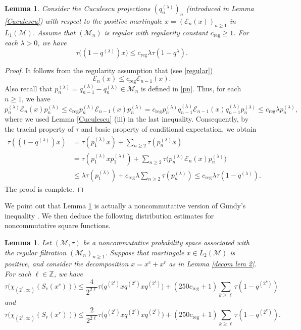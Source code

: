 \documentclass[11]{amsart}
\numberwithin{equation}{section}
\newtheorem{lemma}[theorem]{Lemma}
\newcommand{\M}{\mathcal{M}}
\begin{document}
\begin{lemma}\label{lem CGPr}
	Consider the Cuculescu projections $(q_n^{(\lambda)})_n$ (introduced in Lemma \ref{Cuculescu}) with respect to the positive martingale $x=(\mathcal{E}_n(x))_{n\geq1}$ in $L_1(\M)$. Assume that $(\mathcal{M}_n)$ is regular with regularity constant $c_{\mathrm{reg}}\geq 1$. For each $\lambda>0$, we have
	$$\tau\Big((1-q^{(\lambda)})x\Big)\leq c_{\mathrm{reg}}\lambda\tau(1-q^{\lambda}).$$
\end{lemma}
\begin{proof}
	It follows from the regularity assumption that (see \eqref{regular})
	$$\mathcal{E}_n(x)\leq c_{\mathrm{reg}}\mathcal{E}_{n-1}(x).$$
	Also recall that $p_n^{(\lambda)}=q_{n-1}^{(\lambda)}-q_n^{(\lambda)}\in \mathcal{M}_n$ is defined in \eqref{pn}.	Thus, for each $n\geq1$, we have
	$$p_n^{(\lambda)}\mathcal{E}_n(x)p_n^{(\lambda)}\leq c_{\mathrm{reg}}p_n^{(\lambda)}\mathcal{E}_{n-1}(x)p_n^{(\lambda)}=c_{\mathrm{reg}}p_n^{(\lambda)}q_{n-1}^{(\lambda)}\mathcal{E}_{n-1}(x)q_{n-1}^{(\lambda)}p_n^{(\lambda)}\leq  c_{\mathrm{reg}} \lambda p_n^{(\lambda)},$$
	where we used Lemma \ref{Cuculescu} (iii) in the last inequality.
	Consequently, by the tracial property of $\tau$ and basic property of conditional expectation, we obtain
	\begin{align*}
		\tau((1-q^{(\lambda)})x)&=\tau(p_1^{(\lambda)}x)+\sum_{n\geq2} \tau(p_n^{(\lambda)}x)\\
		&=\tau(p_1^{(\lambda)}xp_1^{(\lambda)})+\sum_{n\geq2} \tau\Big(p_n^{(\lambda)}\mathcal{E}_n(x)p_n^{(\lambda)}\Big)\\
		&\leq \lambda\tau(p_1^{(\lambda)})+c_{\mathrm{reg}}\lambda \sum_{n\geq2}\tau (p_n^{(\lambda)})\leq c_{\mathrm{reg}}\lambda \tau(1-q^{(\lambda)}).
	\end{align*}
	The proof is complete. 
\end{proof}




We point out that Lemma \ref{lem CGPr} is actually a noncommutative version of Gundy's inequality \cite[Theorem 2]{Gu1969}. 
We then deduce the following distribution estimates for noncommutative square functions. 



\begin{lemma}\label{distribution S}
	Let $(\mathcal{M},\tau)$ be a noncommutative probability space associated with the regular filtration $(\mathcal{M}_n)_{n\geq1}$. 
	Suppose that martingale $x\in L_2(\mathcal{M})$ is positive, and consider the decomposition $x=x^c+x^r$ as in Lemma \ref{decom lem 2}. For each $\ell\in\mathbb{Z}$, we have 
	$$\tau\Big(\chi_{(2^{\ell},\infty)}(S_c(x^c))\Big)\leq  \frac{4}{2^{2\ell}} \tau\Big(q^{(2^{\ell})}xq^{(2^{\ell})}xq^{(2^{\ell})}\Big)+(250c_{\mathrm{reg}}+1)\sum_{k\geq \ell}\tau(1-q^{(2^k)})$$
	and 
	$$\tau\Big(\chi_{(2^{\ell},\infty)}(S_r(x^r))\Big)\leq \frac{2}{2^{2\ell}} \tau\Big(q^{(2^{\ell})}xq^{(2^{\ell})}xq^{(2^{\ell})}\Big)+(250c_{\mathrm{reg}}+1)\sum_{k\geq \ell}\tau(1-q^{(2^k)}).$$
\end{lemma}
\end{document}
